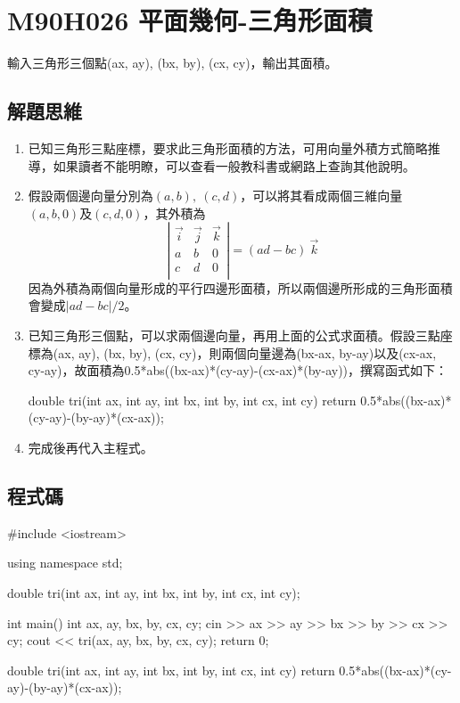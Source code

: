 \section{M90H026 平面幾何-三角形面積}
輸入三角形三個點(ax, ay), (bx, by), (cx, cy)，輸出其面積。
\subsection{解題思維}
\begin{enumerate}
	\item 已知三角形三點座標，要求此三角形面積的方法，可用向量外積方式簡略推導，如果讀者不能明瞭，可以查看一般教科書或網路上查詢其他說明。
	\item 假設兩個邊向量分別為$(a,b),\ (c,d)$，可以將其看成兩個三維向量
	$(a,b,0)$及$(c,d,0)$，其外積為
	$$\left|\begin{array}{ccc}
	\vec{i} & \vec{j} & \vec{k} \\
	a & b & 0 \\
	c & d & 0 \\
	\end{array}\right| = (ad-bc)\ \vec{k}$$
	因為外積為兩個向量形成的平行四邊形面積，所以兩個邊所形成的三角形面積會變成$|ad-bc|/2$。
	\item 已知三角形三個點，可以求兩個邊向量，再用上面的公式求面積。假設三點座標為(ax, ay), (bx, by), (cx, cy)，則兩個向量邊為(bx-ax, by-ay)以及(cx-ax, cy-ay)，故面積為0.5*abs((bx-ax)*(cy-ay)-(cx-ax)*(by-ay))，撰寫函式如下：
	\begin{inside}
	double tri(int ax, int ay, int bx, int by, int cx, int cy) {
		return 0.5*abs((bx-ax)*(cy-ay)-(by-ay)*(cx-ax));
	}		
	\end{inside}
	\item
	完成後再代入主程式。
\end{enumerate} 

\subsection{程式碼}
\begin{cppcode}
	#include <iostream>

	using namespace std;
	
	double tri(int ax, int ay, int bx, int by, int cx, int cy);
	
	int main(){
		int ax, ay, bx, by, cx, cy;
		cin >> ax >> ay >> bx >> by >> cx >> cy;
		cout << tri(ax, ay, bx, by, cx, cy);
		return 0;
	}
	
	double tri(int ax, int ay, int bx, int by, int cx, int cy) {
		return 0.5*abs((bx-ax)*(cy-ay)-(by-ay)*(cx-ax));
	}		
\end{cppcode}
